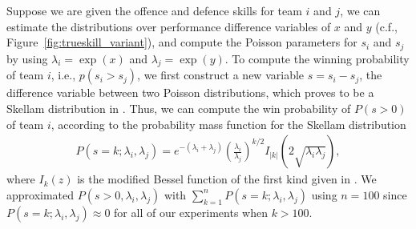\documentclass[runningheads,a4paper]{llncs}
\begin{document}

Suppose we
are given the offence and defence skills for team $i$ and $j$, we can
estimate the distributions over performance difference variables of
$x$ and $y$ (c.f., Figure~\ref{fig:trueskill_variant}), and compute
the Poisson parameters for $s_i$ and $s_j$ by using $\lambda_i =
\exp(x)$ and $\lambda_j = \exp(y)$. To compute the winning probability
of team $i$, i.e., $p(s_i>s_j)$, we first construct a new variable $s
= s_i-s_j$, the difference variable between two Poisson distributions,
which proves to be a Skellam distribution in
\cite{Skellam46TheFrequencyDistribution}. Thus, we can compute the win
probability of $P(s>0)$ of team $i$, according to the probability mass
function for the Skellam distribution
{\small
\begin{align*}
     P(s=k; \lambda_i, \lambda_j) =e^{-(\lambda_i+\lambda_j)}\left(\frac{\lambda_i}{\lambda_j}\right)^{k/2}I_{|k|}\left(2\sqrt{\lambda_i\lambda_j}\right),
\end{align*}}
where $I_{k}(z)$ is the modified Bessel function of the first kind given in \cite{Abramowitz74HandbookOfMathematical}.
We approximated $P(s>0,\lambda_i, \lambda_j)$ with
$\sum_{k=1}^{n} P(s=k; \lambda_i, \lambda_j)$ using $n=100$ since
$P(s=k; \lambda_i, \lambda_j) \approx 0$ for all of our experiments
when $k>100$.
\end{document}
